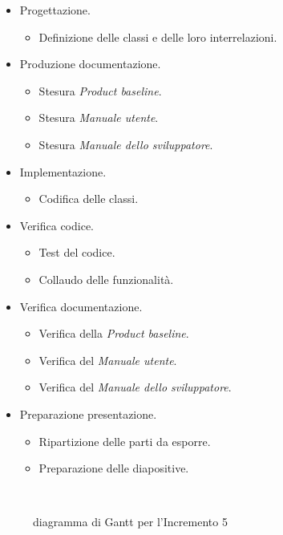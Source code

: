 \documentclass[../piano-di-progetto.tex]{subfiles}
\begin{document}
\begin{itemize}
  \item Progettazione.
  \begin{itemize}
    \item Definizione delle classi e delle loro interrelazioni.
  \end{itemize}
  \item Produzione documentazione.
  \begin{itemize}
    \item Stesura \textit{Product baseline}.
    \item Stesura \textit{Manuale utente}.
    \item Stesura \textit{Manuale dello sviluppatore}.
  \end{itemize}
  \item Implementazione.
  \begin{itemize}
    \item Codifica delle classi.
  \end{itemize}
  \item Verifica codice.
  \begin{itemize}
    \item Test del codice.
    \item Collaudo delle funzionalità.
  \end{itemize}
  \item Verifica documentazione.
  \begin{itemize}
    \item Verifica della \textit{Product baseline}.
    \item Verifica del \textit{Manuale utente}.
    \item Verifica del \textit{Manuale dello sviluppatore}.
  \end{itemize}
  \item Preparazione presentazione.
  \begin{itemize}
    \item Ripartizione delle parti da esporre.
    \item Preparazione delle diapositive.
  \end{itemize}
\end{itemize}
\begin{figure}[H]
  \centering
  
  \caption{diagramma di Gantt per l'Incremento 5}%
~~\label{fig:gantt_incremento_5}
\end{figure}
\end{document}
